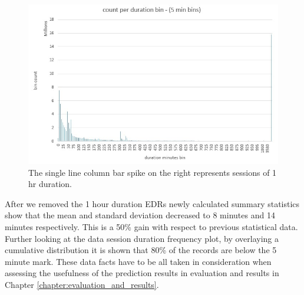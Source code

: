 \documentclass[12pt, a4paper]{report}
\theoremstyle{definition}
\theoremstyle{definition}%
\theoremstyle{definition}%
\theoremstyle{definition}%
\theoremstyle{definition}%
\theoremstyle{definition}%
\begin{document}
 
\begin{figure}	
	\includegraphics[scale=0.75]{data_session_duration_bin_count.jpg}
	\centering
	\caption[Data session duration distribution]{The single line column bar spike on the right represents sessions of 1 hr duration.}
	\label{fig:data_session_duration_bin_count}
\end{figure}

After we removed the 1 hour duration EDRs newly calculated summary statistics show that the mean and standard deviation decreased to 8 minutes and 14 minutes respectively. This is a 50\% gain with respect to previous statistical data. Further looking at the data session duration frequency plot, by overlaying a cumulative distribution it is shown that 80\% of the records are below the 5 minute mark. These data facts have to be all taken in consideration when assessing the usefulness of the prediction results in evaluation and results in Chapter \ref{chapter:evaluation_and_results}. 



\begin{table}[h]
	\label{table:summary statistics_02}
	\centering
	\caption{Basic summary statistics of main EDR dataset after removing 1 hour duration EDRs.} 
\end{table}
\end{document}
